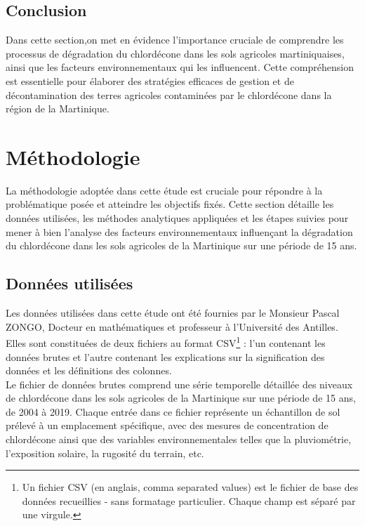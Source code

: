 \documentclass{report}
\begin{document}
\section*{Conclusion}
Dans cette section,on met en évidence l'importance cruciale de comprendre les processus de dégradation du chlordécone dans les sols agricoles martiniquaises, ainsi que les facteurs environnementaux qui les influencent. Cette compréhension est essentielle pour élaborer des stratégies efficaces de gestion et de décontamination des terres agricoles contaminées par le chlordécone dans la région de la Martinique.



\chapter*{Méthodologie}


La méthodologie adoptée dans cette étude est cruciale pour répondre à la problématique posée et atteindre les objectifs fixés. Cette section détaille les données utilisées, les méthodes analytiques appliquées et les étapes suivies pour mener à bien l'analyse des facteurs environnementaux influençant la dégradation du chlordécone dans les sols agricoles de la Martinique sur une période de 15 ans.\\



\section*{Données utilisées}

Les données utilisées dans cette étude ont été fournies par le Monsieur Pascal ZONGO, Docteur en mathématiques et professeur à l'Université des Antilles. Elles sont constituées de deux fichiers au format CSV\footnote{Un fichier CSV (en anglais, comma separated values) est le fichier de base des données
recueillies - sans formatage particulier. Chaque champ est séparé par une virgule. } : l'un contenant les données brutes et l'autre contenant les explications sur la signification des données et les définitions des colonnes.\\

Le fichier de données brutes comprend une série temporelle détaillée des niveaux de chlordécone dans les sols agricoles de la Martinique sur une période de 15 ans, de 2004 à 2019. Chaque entrée dans ce fichier représente un échantillon de sol prélevé à un emplacement spécifique, avec des mesures de concentration de chlordécone ainsi que des variables environnementales telles que la pluviométrie, l'exposition solaire, la rugosité du terrain, etc.\\
\end{document}
